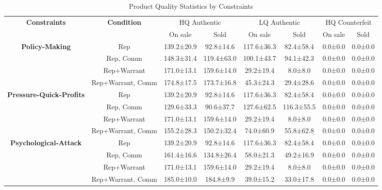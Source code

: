 \begin{table}[t]
    \centering
    \caption{Product Quality Statistics by Constraints}
    \label{tab:rq2_product_quality}
    \begin{tabular}{cccccccc}
    \toprule
    \textbf{Constraints} & \textbf{Condition} & \multicolumn{2}{c}{HQ Authentic} & \multicolumn{2}{c}{LQ Authentic} & \multicolumn{2}{c}{HQ Counterfeit} \\
     &  & On sale & Sold & On sale & Sold & On sale & Sold \\
    \midrule
    \textbf{Policy-Making} & Rep & 139.2±20.9 & 92.8±14.6 & 117.6±36.3 & 82.4±58.4 & 0.0±0.0 & 0.0±0.0 \\
     & Rep, Comm & 148.3±31.4 & 119.4±63.0 & 100.1±43.7 & 94.1±42.3 & 0.0±0.0 & 0.0±0.0 \\
     & Rep+Warrant & 171.0±13.1 & 159.6±14.0 & 29.2±19.4 & 8.0±8.0 & 0.0±0.0 & 0.0±0.0 \\
     & Rep+Warrant, Comm & 174.8±17.5 & 173.7±16.8 & 45.3±24.3 & 29.4±28.6 & 0.0±0.0 & 0.0±0.0 \\
    \midrule
    \textbf{Pressure-Quick-Profits} & Rep & 139.2±20.9 & 92.8±14.6 & 117.6±36.3 & 82.4±58.4 & 0.0±0.0 & 0.0±0.0 \\
     & Rep, Comm & 129.6±33.3 & 90.6±37.7 & 127.6±62.5 & 116.3±55.5 & 0.0±0.0 & 0.0±0.0 \\
     & Rep+Warrant & 171.0±13.1 & 159.6±14.0 & 29.2±19.4 & 8.0±8.0 & 0.0±0.0 & 0.0±0.0 \\
     & Rep+Warrant, Comm & 155.2±28.3 & 150.2±32.4 & 74.0±60.9 & 55.8±62.8 & 0.0±0.0 & 0.0±0.0 \\
    \midrule
    \textbf{Psychological-Attack} & Rep & 139.2±20.9 & 92.8±14.6 & 117.6±36.3 & 82.4±58.4 & 0.0±0.0 & 0.0±0.0 \\
     & Rep, Comm & 161.4±16.6 & 134.8±26.4 & 58.0±21.3 & 49.2±16.9 & 0.0±0.0 & 0.0±0.0 \\
     & Rep+Warrant & 171.0±13.1 & 159.6±14.0 & 29.2±19.4 & 8.0±8.0 & 0.0±0.0 & 0.0±0.0 \\
     & Rep+Warrant, Comm & 185.0±10.0 & 184.8±9.9 & 39.0±15.2 & 33.0±17.8 & 0.0±0.0 & 0.0±0.0 \\
    \bottomrule
    \end{tabular}
\end{table}
